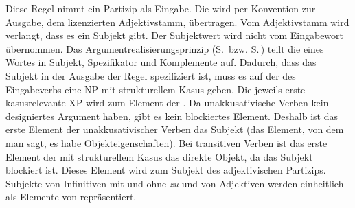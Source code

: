 {\noindent
Diese Regel nimmt ein Partizip als Eingabe. Die \argstl wird per Konvention zur Ausgabe, dem
lizenzierten Adjektivstamm, übertragen. Vom Adjektivstamm wird verlangt, dass es ein Subjekt
gibt. Der Subjektwert wird nicht vom Eingabewort übernommen. Das
Argumentrealisierungsprinzip (S.\,\pageref{Prinzip-Argumentrealisierung-einfach} bzw. S.\,\pageref{Prinzip-Argumentrealisierung-einfach-SUBJ-lexical-sign}) teilt die \argstl eines Wortes in Subjekt, Spezifikator und Komplemente
auf. Dadurch, dass das Subjekt in der Ausgabe der Regel spezifiziert ist, muss es auf der \argstl
des Eingabeverbs eine NP mit strukturellem Kasus geben. Die jeweils erste kasusrelevante XP
wird zum Element der \subjl. Da unakkusativische Verben kein designiertes
Argument haben, gibt es kein blockiertes Element. Deshalb ist das erste
Element der \argstl unakkusativischer Verben das Subjekt (das Element, von dem
man sagt, es habe Objekteigenschaften). Bei transitiven Verben ist das
erste Element der \argstl mit strukturellem Kasus das direkte Objekt, da das Subjekt
blockiert ist. Dieses Element wird zum Subjekt des adjektivischen Partizips.
Subjekte von Infinitiven mit und ohne \emph{zu} und von Adjektiven werden
einheitlich als Elemente von \subj repräsentiert. 

}
